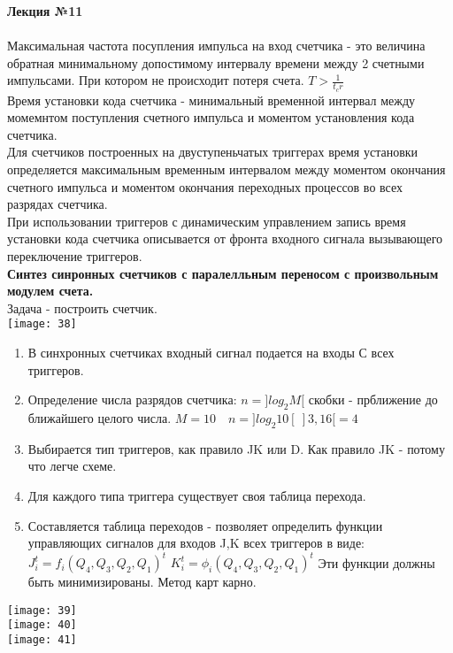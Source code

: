 

\LARGE{ \textbf {Лекция №11}}\\
\Large{ \textbf {}}\\

Максимальная частота посупления импульса на вход счетчика - это величина обратная
минимальному допостимому интервалу времени между 2 счетными импульсами.
При котором не происходит потеря счета.
$T > \frac{1}{t_cr}$\\
Время установки кода счетчика - минимальный временной интервал между момемнтом поступления
счетного импульса и моментом установления кода счетчика.\\

Для счетчиков построенных на двуступеньчатых триггерах время установки определяется максимальным
временным интервалом между моментом окончания счетного импульса и моментом окончания переходных процессов во всех разрядах счетчика.\\
При использовании триггеров с динамическим управлением запись время установки кода счетчика
описывается от фронта входного сигнала вызывающего переключение триггеров.\\
\textbf{Синтез синронных счетчиков с паралелльным переносом с произвольным модулем счета.}\\
Задача - построить счетчик.\\
\texttt{[image: 38]}\\

\begin{enumerate}
  \item В синхронных счетчиках входный сигнал подается на входы С всех триггеров.
  \item Определение числа разрядов счетчика: $n = ]log_2 M[$ скобки - прближение до ближайшего целого числа.
  $M =10 \quad n = ]log_2 10 [~]3,16[ = 4 $
  \item Выбирается тип триггеров, как правило JK или D.
  Как правило JK - потому что легче схеме.
  \item Для каждого типа триггера существует своя таблица перехода.
  \item Составляется таблица переходов - позволяет определить функции управляющих сигналов для входов J,K всех триггеров в виде:
  $ J_i^t = f_i(Q_4,Q_3,Q_2,Q_1)^t$  $ K_i^t = \phi_i(Q_4,Q_3,Q_2,Q_1)^t$
  Эти функции должны быть минимизированы. Метод карт карно.
\end{enumerate}
\texttt{[image: 39]}\\
\texttt{[image: 40]}\\
\texttt{[image: 41]}\\


